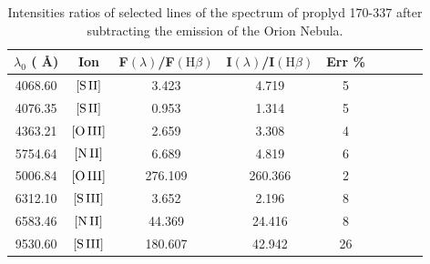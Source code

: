 \documentclass[fleqn,usenatbib]{mnras}
\begin{document}
\begin{table}
\caption{Intensities ratios of selected lines of  the spectrum of proplyd 170-337 after subtracting the emission of the Orion Nebula.} 
\label{tab:fluxes_proplyd}
\begin{tabular}{ccccccccc} 
\hline
$\lambda_0$ ( \AA ) & Ion & F$\left( \lambda \right)$/F$\left( \mbox{H}\beta \right)$ & I$\left( \lambda \right)$/I$\left( \mbox{H}\beta \right)$ & Err \% \\
\hline
4068.60 & $\mbox{[S}\thinspace \mbox{II]}$ & 3.423 & 4.719 & 5  \\
4076.35 & $\mbox{[S}\thinspace \mbox{II]}$ & 0.953 & 1.314 & 5  \\
4363.21 & $\mbox{[O}\thinspace \mbox{III]}$ & 2.659 & 3.308 & 4 \\
5754.64 & $\mbox{[N}\thinspace \mbox{II]}$ & 6.689 & 4.819 & 6 &  \\
5006.84 & $\mbox{[O}\thinspace \mbox{III]}$ & 276.109 & 260.366 & 2 \\
6312.10 & $\mbox{[S}\thinspace \mbox{III]}$ & 3.652 & 2.196 & 8 &  \\
6583.46 & $\mbox{[N}\thinspace \mbox{II]}$ & 44.369 & 24.416 & 8 &  \\
9530.60 & $\mbox{[S}\thinspace \mbox{III]}$ & 180.607 & 42.942 & 26 \\
\hline
\end{tabular}
\end{table}




\bsp	%
\label{lastpage}
\end{document}

